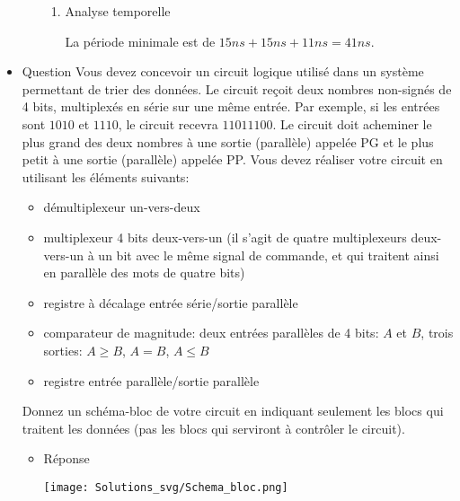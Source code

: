 \documentclass[letter, oneside]{book}
\begin{document}
\begin{itemize}
\begin{itemize}
\begin{enumerate}
\item Analyse temporelle

\begin{center}

\end{center}

La période minimale est de \(15 ns+15 ns+11 ns = 41 ns\).
\end{enumerate}
\end{itemize}

\item Question
\label{sec:org344f766}
Vous devez concevoir un circuit logique utilisé dans un système
permettant de trier des données. Le circuit reçoit deux nombres
non-signés de 4 bits, multiplexés en série sur une même entrée. Par
exemple, si les entrées sont \(1010\) et \(1110\), le circuit recevra \(11011100\). 
Le circuit doit acheminer le plus grand des deux nombres à
une sortie (parallèle) appelée PG et le plus petit à une sortie
(parallèle) appelée PP. Vous devez réaliser votre circuit en utilisant
les éléments suivants:

\begin{itemize}
\item démultiplexeur un-vers-deux

\item multiplexeur 4 bits deux-vers-un (il s'agit de quatre
multiplexeurs deux-vers-un à un bit avec le même signal de
commande, et qui traitent ainsi en parallèle des mots de quatre bits)

\item registre à décalage entrée série/sortie parallèle

\item comparateur de magnitude: deux entrées parallèles de 4 bits: \(A\) et
\(B\), trois sorties: \(A\geq B\), \(A=B\), \(A \leq B\)

\item registre entrée parallèle/sortie parallèle
\end{itemize}

Donnez un schéma-bloc de votre circuit en indiquant seulement les
blocs qui traitent les données (pas les blocs qui serviront à
contrôler le circuit).

\begin{itemize}
\item Réponse
\label{sec:orgd0d09bf}
\begin{center}
\texttt{[image: Solutions\_svg/Schema\_bloc.png]}
\end{center}
\end{itemize}


\end{itemize}
\end{document}

